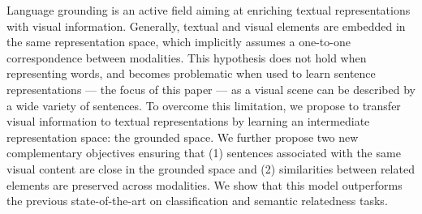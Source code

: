 Language grounding is an active field aiming at enriching textual representations with visual information. Generally, textual and visual elements are embedded in the same representation space, which implicitly assumes a one-to-one correspondence between modalities. This hypothesis does not hold when representing words, and becomes problematic when used to learn sentence representations --- the focus of this paper --- as a visual scene can be described by a wide variety of sentences. To overcome this limitation, we propose to transfer visual information to textual representations by learning an intermediate representation space: the grounded space. We further propose two new complementary objectives ensuring that (1) sentences associated with the same visual content are close in the grounded space and (2) similarities between related elements are preserved across modalities. We show that this model outperforms the previous state-of-the-art on classification and semantic relatedness tasks.